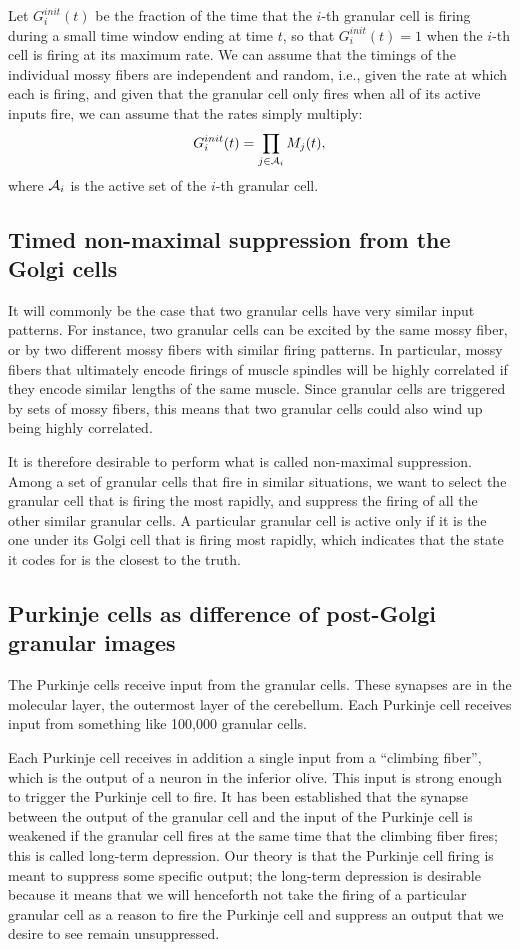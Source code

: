 \documentclass{article}
\theoremstyle{definition}
\begin{document}
Let $G^{init}_i(t)$ be the fraction of the time that the $i$-th
granular cell is firing during a small time window ending at time $t$,
so that $G^{init}_i(t)=1$ when the $i$-th cell is firing at its
maximum rate. We can assume that the timings of the individual mossy
fibers are independent and random, i.e., given the rate at which each
is firing, and given that the granular cell only fires when all of its
active inputs fire, we can assume that the rates simply
multiply:
$$G^{init}_i(t) = \prod_{j\in {\mathcal A}_i} M_j(t),$$
where ${\mathcal A}_i$ is the active set of the $i$-th granular cell.

\subsection{Timed non-maximal suppression from the Golgi cells}

It will commonly be the case that two granular cells have very similar
input patterns. For instance, two granular cells can be excited by the
same mossy fiber, or by two different mossy fibers with similar firing
patterns. In particular, mossy fibers that ultimately encode firings
of muscle spindles will be highly correlated if they encode similar
lengths of the same muscle. Since granular cells are triggered by sets
of mossy fibers, this means that two granular cells could also wind up
being highly correlated.

It is therefore desirable to perform what is called non-maximal
suppression. Among a set of granular cells that fire in similar
situations, we want to select the granular cell that is firing the
most rapidly, and suppress the firing of all the other similar
granular cells. A particular granular cell is active only if it is the
one under its Golgi cell that is firing most rapidly, which indicates
that the state it codes for is the closest to the truth. 

\subsection{Purkinje cells as difference of post-Golgi granular images}

The Purkinje cells receive input from the granular cells. These
synapses are in the molecular layer, the outermost layer of the
cerebellum. Each Purkinje cell receives input from something like
100,000 granular cells.

Each Purkinje cell receives in addition a single input from a
``climbing fiber'', which is the output of a neuron in the inferior
olive. This input is strong enough to trigger the Purkinje cell to
fire. It has been established that the synapse between the output of
the granular cell and the input of the Purkinje cell is weakened if
the granular cell fires at the same time that the climbing fiber
fires; this is called long-term depression. Our theory is that the
Purkinje cell firing is meant to suppress some specific output; the
long-term depression is desirable because it means that we will
henceforth not take the firing of a particular granular cell as a
reason to fire the Purkinje cell and suppress an output that we desire
to see remain unsuppressed.
\end{document}
